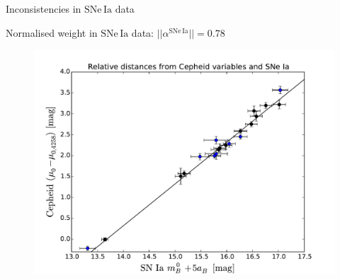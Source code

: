 \documentclass{beamer}
\newcommand{\SNe}{\mathrm{SNe\,Ia}}
\begin{document}
\begin{frame}{Inconsistencies in $\SNe$ data}
\begin{center}
Normalised weight in $\SNe$ data: $|| \alpha^{\SNe}|| = 0.78 $
\end{center}
\begin{figure}
\includegraphics[scale=0.45]{../figures/chapter-h0/effective_HP_SNIa_R16.pdf} 
\end{figure}
\end{frame}
\end{document}
